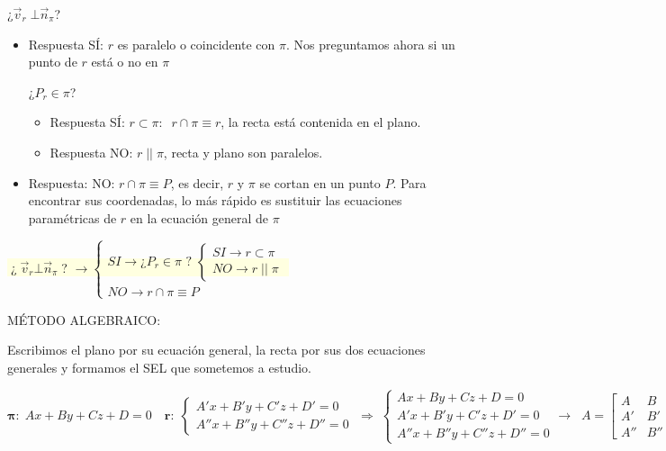 ¿$\vec v_r \; \bot \vec n_{\pi}$?

\begin{itemize}
\item Respuesta SÍ: $r$ es paralelo o coincidente con $\pi$. Nos preguntamos ahora si un punto de $r$ está o no en $\pi$

¿$P_r \in \pi$?
	\begin{itemize}
	\item Respuesta SÍ: $r \subset \pi: \;\; r\cap \pi \equiv r$, la recta está contenida en el plano.
	\item Respuesta NO: $r\;||\; \pi$, recta y plano son paralelos.
	\end{itemize} 
\item Respuesta: NO:  $r\cap \pi \equiv P$, es decir, $r$ y $\pi$ se cortan en un punto $P$. Para encontrar sus coordenadas, lo más rápido es sustituir las ecuaciones paramétricas de $r$ en la ecuación general de $\pi$
\end{itemize}


\centerline{\colorbox{LightYellow}{$\;$¿$\;\vec v_r \bot \vec n_{\pi} \;$? 
$\to \begin{cases} SI \to \text{¿} P_{r}\in \pi \text{ ? } 
 	\begin{cases} 
 	SI \to r \subset \pi \\ 
 	NO \to r \; || \; \pi 
 	\end{cases}
 \\ NO \longrightarrow r \cap \pi \equiv P	
 \end{cases}$}}

MÉTODO ALGEBRAICO:

Escribimos el plano por su ecuación general, la recta por sus dos ecuaciones generales y formamos el SEL que sometemos a estudio.

$\boldsymbol{\pi:} \; Ax+By+Cz+D=0 \quad \boldsymbol{r:}\; \begin{cases}   A'x+B'y+C'z+D'=0  \\  A''x+B''y+C''z+D''=0 \end{cases} \; \Rightarrow \;
\begin{cases}  Ax+By+Cz+D=0 \\ A'x+B'y+C'z+D'=0  \\  A''x+B''y+C''z+D''=0 \end{cases} \to \;\;A=\left[ \begin{matrix} A&B&C\\A'&B'&C' \\ A''&B''&C'' \end{matrix} \right. \left| \begin{matrix} -D\\-D'\\-D'' \end{matrix} \right]\leftarrow A^*$

